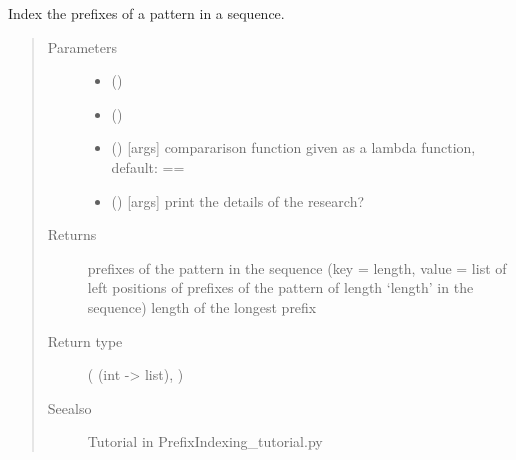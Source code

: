 \documentclass[letterpaper,10pt,english]{sphinxmanual}
\begin{document}
\begin{fulllineitems}
\label{\detokenize{index:PrefixIndexing.prefix_indexing}}
Index the prefixes of a pattern in a sequence.
\begin{quote}\begin{description}
\item[{Parameters}] \leavevmode\begin{itemize}
\item {} 
 () \textendash{} 

\item {} 
 () \textendash{} 

\item {} 
 () \textendash{} {[}args{]} compararison function given as a lambda function, default: ==

\item {} 
 () \textendash{} {[}args{]} print the details of the research?

\end{itemize}

\item[{Returns}] \leavevmode
prefixes of the pattern in the sequence (key = length, value = list of left positions of prefixes of the pattern of length ‘length’ in the sequence)  length of the longest prefix

\item[{Return type}] \leavevmode
{} (  (int -\textgreater{} list), )

\item[{Seealso}] \leavevmode
Tutorial in PrefixIndexing\_tutorial.py


\end{description}
\end{quote}
\end{fulllineitems}
\end{document}
